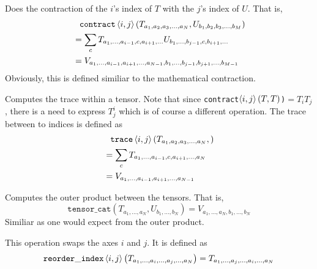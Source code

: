 \documentclass[a4paper]{article}
\begin{document}
\begin{description}[style=nextline]
\item[\texttt{contract$\braket{i,j}(T,U)$}]
Does the contraction of the $i$'s index of $T$ with the $j$'s index of $U$. That is,
\begin{align*}
&\phantom{=}
\mathtt{contract}\braket{i,j}\left(
   T_{a_1,a_2,a_3,\dots,a_N},
   U_{b_1,b_2,b_3,\dots,b_M}
\right) \\
&=
\sum_c
T_{a_1,\dots,a_{i-1},c,a_{i+1},\dots}
U_{b_1,\dots,b_{j-1},c,b_{i+1},\dots}
\\
&=
V_{a_1,\dots,a_{i-1},a_{i+1},\dots,a_{N-1},
   b_1,\dots,b_{j-1},b_{j+1},\dots,b_{M-1}}
\end{align*}
Obviously, this is defined similiar to the
mathematical contraction.

\item[\texttt{trace$\braket{i,j}(T)$}]
Computes the trace within a tensor. Note that
since
\texttt{contract$\braket{i,j}(T,T)$)}$=T_i T_j$,
there is a need to express $T^i_j$ which is
of course a different operation. The trace
between to indices is defined as
\begin{align*}
&\phantom{=}
\mathtt{trace}\braket{i,j}\left(
   T_{a_1,a_2,a_3,\dots,a_N},
\right) \\
&=
\sum_c
T_{a_1,\dots,a_{i-1},c,a_{i+1},\dots,a_N}
\\
&=
V_{a_1,\dots,a_{i-1},a_{i+1},\dots,a_{N-1}}
\end{align*}

\item[\texttt{tensor\_cat($T$,$U$)}]
Computes the outer product between the tensors.
That is,
\begin{equation*}
\mathtt{tensor\_cat}(
  T_{a_1,\dots,a_N},
  U_{b_1,\dots,b_N}
) = V_{a_1,\dots,a_N,b_1,\dots,b_N}
\end{equation*}
Similiar as one would expect from the outer
product.

\item[\texttt{reorder\_index<$i$,$j$>($T$)}]
This operation swaps the axes $i$ and $j$.
It is defined as
\begin{equation*}
\mathtt{reorder\_index}\braket{i,j}\left(
T_{a_1,\dots,a_i,\dots,a_j,\dots,a_N}
\right)
= T_{a_1,\dots,a_j,\dots,a_i,\dots,a_N}
\end{equation*}

\end{description}
\end{document}
